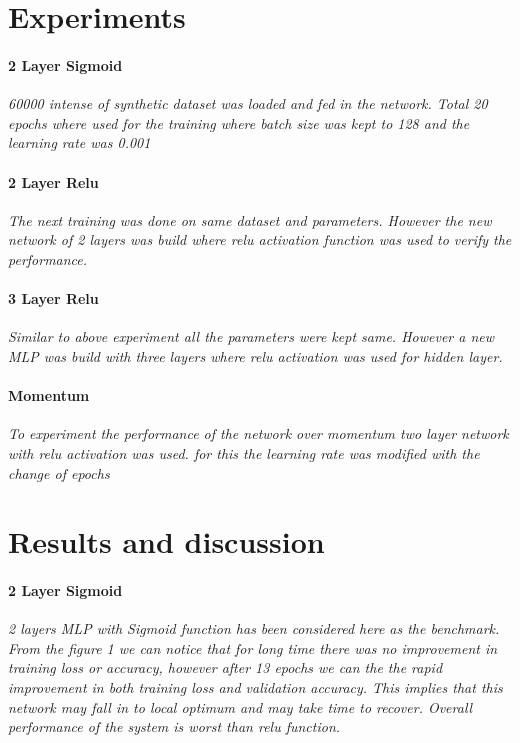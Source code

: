 \documentclass[a4 paper]{article}
\begin{document}
\section{Experiments}
\paragraph{2 Layer Sigmoid}\textit{60000 intense of synthetic dataset was loaded and fed in the network. Total 20 epochs where used for the training where batch size was kept to 128 and the learning rate was 0.001}

\paragraph{2 Layer Relu}\textit{The next training was done on same dataset and parameters. However the new network of 2 layers was build where relu activation function was used to verify the performance.}

\paragraph{3 Layer Relu}\textit{Similar to above experiment all the parameters were kept same. However a new MLP was build with three layers where relu activation was used for hidden layer.}

\paragraph{Momentum}\textit{To experiment the performance of the network over momentum two layer network with relu activation was used. for this the learning rate was modified with the change of epochs}


\section{Results and discussion}

\paragraph{2 Layer Sigmoid}\textit{2 layers MLP with Sigmoid function has been considered here as the benchmark. From the figure 1 we can notice that for long time there was no improvement in training loss or accuracy, however after 13 epochs we can the the rapid improvement in both training loss and validation accuracy. This implies that this network may fall in to local optimum and may take time to recover. Overall performance of the system is worst than relu function.}
\end{document}
